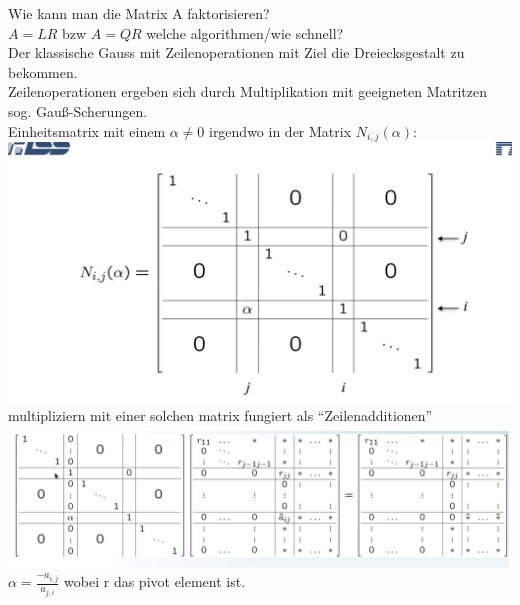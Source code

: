 \documentclass{article}
\begin{document}
	Wie kann man die Matrix A faktorisieren?\\
	$A=LR$ bzw $A=QR$ welche algorithmen/wie schnell?\\
	Der klassische Gauss mit Zeilenoperationen mit Ziel die  Dreiecksgestalt zu bekommen.\\
	Zeilenoperationen ergeben sich durch Multiplikation mit geeigneten Matritzen sog. Gauß-Scherungen.\\
	Einheitsmatrix mit einem $\alpha\neq 0$ irgendwo in der Matrix $N_{i,j}(\alpha)$:\\
	\includegraphics{guass-scherung.png}\\
	multipliziern mit einer solchen matrix fungiert als ``Zeilenadditionen''\\
	\includegraphics{multiplizierenMatrixenScherungen.png}\\
	$\alpha = \frac{-a_{i,j}}{a_{j,i}}$ wobei r das pivot element ist.\\
	
\end{document}
